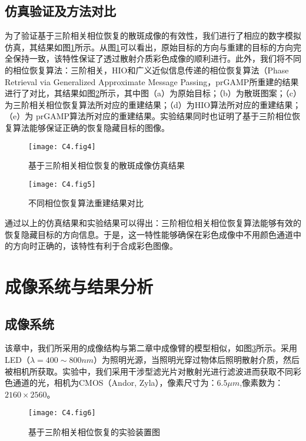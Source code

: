 \subsection{仿真验证及方法对比}
为了验证基于三阶相关相位恢复的散斑成像的有效性，我们进行了相应的数字模拟仿真，其结果如图\ref{fig:4.4}所示。从图\ref{fig:4.4}可以看出，原始目标的方向与重建的目标的方向完全保持一致，该特性保证了透过散射介质彩色成像的顺利进行。此外，我们将不同的相位恢复算法：三阶相关，HIO和广义近似信息传递的相位恢复算法（Phase Retrieval via Generalized Approximate Message Passing，prGAMP所重建的结果进行了对比，其结果如图\ref{fig:4.5}所示，其中图（a）为原始目标；（b）为散斑图案；（c）为三阶相关相位恢复算法所对应的重建结果；（d）为HIO算法所对应的重建结果；（e）为 prGAMP算法所对应的重建结果。实验结果同时也证明了基于三阶相位恢复算法能够保证正确的恢复隐藏目标的图像。

\begin{figure}[htp]
	\centering
	\texttt{[image: C4.fig4]}
	\caption{基于三阶相关相位恢复的散斑成像仿真结果}
	\label{fig:4.4}
\end{figure}

\begin{figure}[htp]
	\centering
	\texttt{[image: C4.fig5]}
	\caption{不同相位恢复算法重建结果对比}
	\label{fig:4.5}
\end{figure}

通过以上的仿真结果和实验结果可以得出：三阶相位相关相位恢复算法能够有效的恢复隐藏目标的方向信息。于是，这一特性能够确保在彩色成像中不用颜色通道中的方向时正确的，该特性有利于合成彩色图像。

\section{成像系统与结果分析}
\subsection{成像系统}
该章中，我们所采用的成像结构与第二章中成像臂的模型相似，如图\ref{fig:4.6}所示。采用LED（$\lambda = 400 \sim 800 nm$）为照明光源，当照明光穿过物体后照明散射介质，然后被相机所获取。实验中，我们采用干涉型滤光片对散射光进行滤波进而获取不同彩色通道的光，相机为CMOS（Andor, Zyla），像素尺寸为：$6.5\mu m$,像素数为：$2160 \times 2560$。

\begin{figure}[htp]
	\centering
	\texttt{[image: C4.fig6]}
	\caption{基于三阶相关相位恢复的实验装置图}
	\label{fig:4.6}
\end{figure}

